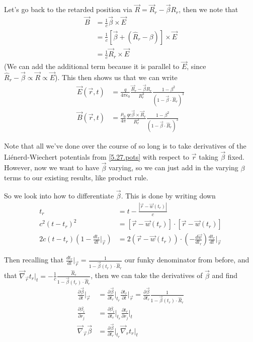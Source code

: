 \documentclass[10pt]{report}
\newcommand{\rd}[2]{\frac{d#1}{d#2}}
\newcommand{\pd}[2]{\frac{\partial #1}{\partial#2}}
\newcommand{\abs}[1]{\left|#1\right|}
\begin{document}
Let's go back to the retarded position via $\vec{R} = \vec{R}_r - \vec{\beta}R_r$, then we note that \begin{align}
    \vec{B} &= \frac{1}{c}\vec{\beta} \times \vec{E}\\
    &= \frac{1}{c}\left[ \vec{\beta} + \left( \hat{R}_r - \beta \right) \right] \times \vec{E}\\
    &= \frac{1}{c}\vec{R}_r \times \vec{E}
\end{align}
(We can add the additional term because it is parallel to $\vec{E}$, since $\hat{R}_r - \vec{\beta} \propto \vec{R} \propto \vec{E}$). This then shows us that we can write
\begin{align}
    \vec{E}(\vec{r},t) &= \frac{q}{4\pi\epsilon_0}\frac{\vec{R}_r - \vec{\beta}R_r}{R_r^3}\frac{1 - \beta^2}{\left( 1 - \vec{\beta} \cdot \hat{R}_r \right)^3}\\
    \vec{B}(\vec{r},t) &= \frac{\mu_0}{4\pi}\frac{qc\vec{\beta} \times \vec{R}_r}{R_r^3}\frac{1 - \beta^2}{\left( 1 - \vec{\beta} \cdot \hat{R}_r \right)^3}
\end{align}

Note that all we've done over the course of so long is to take derivatives of the Li\'enerd-Wiechert potentials from \eqref{5.27.pots} with respect to $\vec{r}$ taking $\vec{\beta}$ fixed. However, now we want to have $\vec{\beta}$ varying, so we can just add in the varying $\beta$ terms to our existing results, like product rule.

So we look into how to differentiate $\vec{\beta}$. This is done by writing down
\begin{align}
    t_r &= t - \frac{\abs{\vec{r} - \vec{w}(t_r)}}{c}\\
    c^2\left( t - t_r \right)^2 &= \left[ \vec{r} - \vec{w}(t_r) \right] \cdot \left[ \vec{r} - \vec{w}(t_r) \right]\\
    2c(t-t_r)\left( 1 - \rd{t_r}{t}\Bigg|_{\vec{r}} \right) &= 2\left( \vec{r} - \vec{w}(t_r) \right)\cdot \left( -\rd{\vec{w}}{t_r} \right)\rd{t_r}{t}\Bigg|_{\vec{r}}
\end{align}

Then recalling that $\rd{t_r}{t}\Big|_{\vec{r}} = \frac{1}{1 - \vec{\beta}(t_r) \cdot \hat{R}_r}$ our funky denominator from before, and that $\vec{\nabla}_{\vec{r}} t_r\Big|_t = -\frac{1}{c}\frac{\hat{R}_r}{1 - \vec{\beta}(t_r)\cdot \hat{R}_r}$, then we can take the derivatives of $\vec{\beta}$ and find
\begin{align}
    \pd{\vec{\beta}}{t}\Bigg|_{\vec{r}} &= \pd{\vec{\beta}}{t_r}\Bigg|_{t_r} \pd{t_r}{t}\Bigg|_{\vec{r}} = \pd{\vec{\beta}}{t_r}\frac{1}{1 - \vec{\beta}(t_r) \cdot \hat{R}_r}\\
    \pd{\beta_i}{r_j} &= \pd{\beta_i}{t_r}\Bigg|_{t_r}\pd{t_r}{r_j}\Bigg|_t\\
    \vec{\nabla}_{\vec{r}} \vec{\beta} &= \pd{\vec{\beta}}{t_r}\Bigg|_{t_r}\vec{\nabla}_r t_r\Bigg|_t
\end{align}
\end{document}
